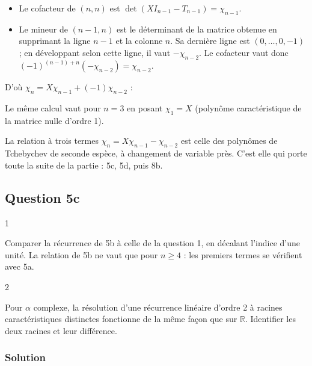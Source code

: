 \documentclass[11pt,a4paper]{article}
\providecommand{\tightlist}{\setlength{\itemsep}{0pt}\setlength{\parskip}{0pt}}
\newcommand{\equationajustee}[1]{%
  \sbox{\boiteequation}{$\displaystyle #1$}%
  \ifdim\wd\boiteequation>\linewidth
    \[\resizebox{\linewidth}{!}{\usebox{\boiteequation}}\]%
  \else
    \[#1\]%
  \fi}
\begin{document}
\begin{itemize}
\tightlist
\item
  Le cofacteur de \((n,n)\) est \(\det(XI_{n-1}-T_{n-1})=\chi_{n-1}\).
\item
  Le mineur de \((n-1,n)\) est le déterminant de la matrice obtenue en supprimant la ligne \(n-1\) et la colonne \(n\). Sa dernière ligne est \((0,\dots,0,-1)\) ; en développant selon cette ligne, il vaut \(-\chi_{n-2}\). Le cofacteur vaut donc \((-1)^{(n-1)+n}(-\chi_{n-2})=\chi_{n-2}\).
\end{itemize}

D'où \(\chi_n=X\chi_{n-1}+(-1)\chi_{n-2}\) :

\equationajustee{\boxed{\chi_n=X\,\chi_{n-1}-\chi_{n-2}\qquad(n\ge4).}}

Le même calcul vaut pour \(n=3\) en posant \(\chi_1=X\) (polynôme caractéristique de la matrice nulle d'ordre 1).

\begin{methode}

La relation à trois termes \(\chi_n=X\chi_{n-1}-\chi_{n-2}\) est celle des polynômes de Tchebychev de seconde espèce, à changement de variable près. C'est elle qui porte toute la suite de la partie : 5c, 5d, puis 8b.

\end{methode}

\hypertarget{question-5c}{%
\subsection{Question 5c}\label{question-5c}}

\begin{indication}{1}

Comparer la récurrence de 5b à celle de la question 1, en décalant l'indice d'une unité. La relation de 5b ne vaut que pour \(n\ge4\) : les premiers termes se vérifient avec 5a.

\end{indication}

\begin{indication}{2}

Pour \(\alpha\) complexe, la résolution d'une récurrence linéaire d'ordre 2 à racines caractéristiques distinctes fonctionne de la même façon que sur \(\mathbb R\). Identifier les deux racines et leur différence.

\end{indication}

\hypertarget{solution-9}{%
\subsubsection{Solution}\label{solution-9}}
\end{document}
